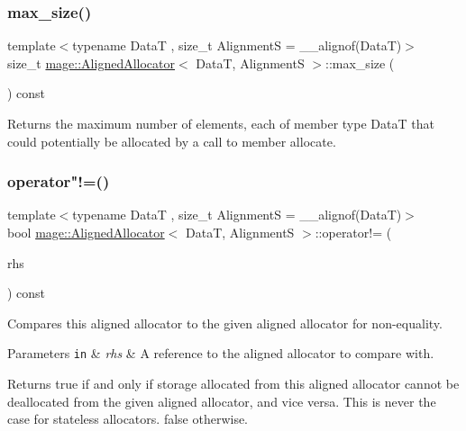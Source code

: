 \subsubsection{\texorpdfstring{max\+\_\+size()}{max\_size()}}
{\footnotesize\ttfamily template$<$typename DataT , size\+\_\+t AlignmentS = \+\_\+\+\_\+alignof(\+Data\+T)$>$ \\
size\+\_\+t \hyperlink{structmage_1_1_aligned_allocator}{mage\+::\+Aligned\+Allocator}$<$ DataT, AlignmentS $>$\+::max\+\_\+size (\begin{DoxyParamCaption}{ }\end{DoxyParamCaption}) const\hspace{0.3cm}{\ttfamily [noexcept]}}

Returns the maximum number of elements, each of member type {\ttfamily DataT} that could potentially be allocated by a call to member allocate. \hypertarget{structmage_1_1_aligned_allocator_a878ebf0d8ad7e6e91bc9d788c8bdbbc7}{}\label{structmage_1_1_aligned_allocator_a878ebf0d8ad7e6e91bc9d788c8bdbbc7} 
\subsubsection{\texorpdfstring{operator"!=()}{operator!=()}}
{\footnotesize\ttfamily template$<$typename DataT , size\+\_\+t AlignmentS = \+\_\+\+\_\+alignof(\+Data\+T)$>$ \\
bool \hyperlink{structmage_1_1_aligned_allocator}{mage\+::\+Aligned\+Allocator}$<$ DataT, AlignmentS $>$\+::operator!= (\begin{DoxyParamCaption}\item[{const \hyperlink{structmage_1_1_aligned_allocator}{Aligned\+Allocator}$<$ DataT, AlignmentS $>$ \&}]{rhs }\end{DoxyParamCaption}) const\hspace{0.3cm}{\ttfamily [noexcept]}}

Compares this aligned allocator to the given aligned allocator for non-\/equality.


\begin{DoxyParams}[1]{Parameters}
\mbox{\tt in}  & {\em rhs} & A reference to the aligned allocator to compare with. \\
\hline
\end{DoxyParams}
\begin{DoxyReturn}{Returns}
{\ttfamily true} if and only if storage allocated from this aligned allocator cannot be deallocated from the given aligned allocator, and vice versa. This is never the case for stateless allocators. {\ttfamily false} otherwise. 
\end{DoxyReturn}
\hypertarget{structmage_1_1_aligned_allocator_ae30b9ecaee6492dc7828e693953d6080}{}\label{structmage_1_1_aligned_allocator_ae30b9ecaee6492dc7828e693953d6080} 

